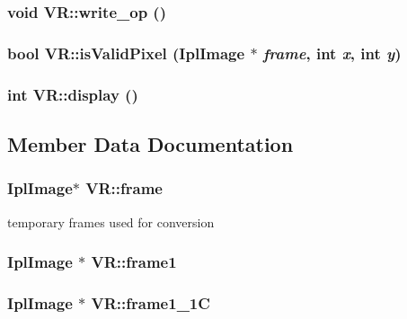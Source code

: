 \subsubsection{\setlength{\rightskip}{0pt plus 5cm}void VR::write\_\-op ()}\label{structVR_deb908503d2d778cc6f36569ebe8e5e8}


\subsubsection{\setlength{\rightskip}{0pt plus 5cm}bool VR::isValidPixel (IplImage $\ast$ {\em frame}, int {\em x}, int {\em y})\hspace{0.3cm}{\tt  [inline]}}\label{structVR_65103f2ef320d705f422221a3308be93}


\subsubsection{\setlength{\rightskip}{0pt plus 5cm}int VR::display ()}\label{structVR_031d562cf0c2918db08c2847f644c1ce}




\subsection{Member Data Documentation}
\subsubsection{\setlength{\rightskip}{0pt plus 5cm}IplImage$\ast$ {\bf VR::frame}}\label{structVR_cccbcf0b1e36faa7decca41269791c8c}


temporary frames used for conversion 

\subsubsection{\setlength{\rightskip}{0pt plus 5cm}IplImage $\ast$ {\bf VR::frame1}}\label{structVR_9b487203a72c655f0d37620f896eda92}


\subsubsection{\setlength{\rightskip}{0pt plus 5cm}IplImage $\ast$ {\bf VR::frame1\_\-1C}}\label{structVR_6618cb5e5a2ac4ba03721d6681099667}


